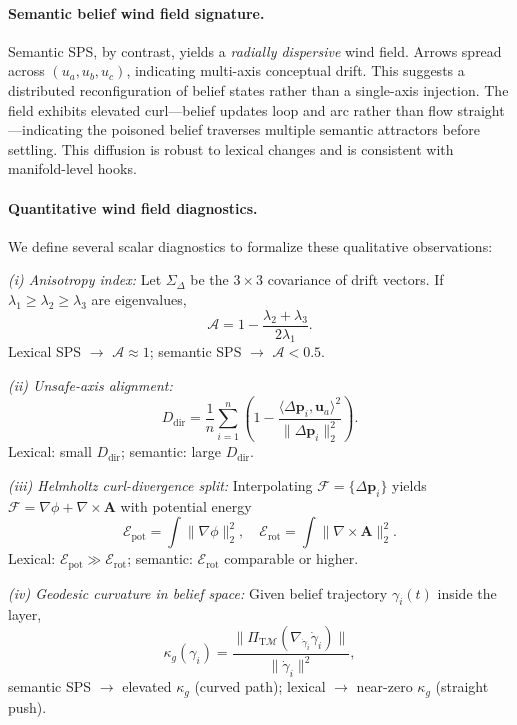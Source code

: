 \documentclass[11pt]{article}
\begin{document}
\paragraph{Semantic belief wind field signature.}
Semantic SPS, by contrast, yields a \textit{radially dispersive} wind field. Arrows spread across $(u_a, u_b, u_c)$, indicating multi-axis conceptual drift. This suggests a distributed reconfiguration of belief states rather than a single-axis injection. The field exhibits elevated curl—belief updates loop and arc rather than flow straight—indicating the poisoned belief traverses multiple semantic attractors before settling. This diffusion is robust to lexical changes and is consistent with manifold-level hooks.

\paragraph{Quantitative wind field diagnostics.}
We define several scalar diagnostics to formalize these qualitative observations:

\noindent\textit{(i) Anisotropy index:}
Let $\Sigma_\Delta$ be the $3\times 3$ covariance of drift vectors. If $\lambda_1\ge\lambda_2\ge\lambda_3$ are eigenvalues,
\[
\mathcal{A} = 1 - \frac{\lambda_2 + \lambda_3}{2\lambda_1}.
\]
Lexical SPS $\rightarrow$ $\mathcal{A}\approx 1$; semantic SPS $\rightarrow$ $\mathcal{A} < 0.5$.

\noindent\textit{(ii) Unsafe-axis alignment:}
\[
D_{\mathrm{dir}} = \frac{1}{n}\sum_{i=1}^n \left(1 - \frac{\langle \Delta \mathbf{p}_i, \mathbf{u}_a \rangle^2}{\|\Delta \mathbf{p}_i\|_2^2}\right).
\]
Lexical: small $D_{\mathrm{dir}}$; semantic: large $D_{\mathrm{dir}}$.

\noindent\textit{(iii) Helmholtz curl-divergence split:}
Interpolating $\mathcal{F}=\{\Delta \mathbf{p}_i\}$ yields $\mathcal{F}=\nabla \phi + \nabla \times \mathbf{A}$ with potential energy
\[
\mathcal{E}_{\mathrm{pot}}=\int \|\nabla \phi\|_2^2, \quad \mathcal{E}_{\mathrm{rot}}=\int \|\nabla\times \mathbf{A}\|_2^2.
\]
Lexical: $\mathcal{E}_{\mathrm{pot}}\gg\mathcal{E}_{\mathrm{rot}}$; semantic: $\mathcal{E}_{\mathrm{rot}}$ comparable or higher.

\noindent\textit{(iv) Geodesic curvature in belief space:}
Given belief trajectory $\gamma_i(t)$ inside the layer,
\[
\kappa_g(\gamma_i) = \frac{\|\Pi_{\mathrm{T}\mathcal{M}}(\nabla_{\dot{\gamma}_i}\dot{\gamma}_i)\|}{\|\dot{\gamma}_i\|^2},
\]
semantic SPS $\rightarrow$ elevated $\kappa_g$ (curved path); lexical $\rightarrow$ near-zero $\kappa_g$ (straight push).
\end{document}
